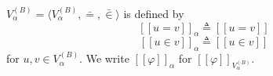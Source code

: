 $V_{\alpha}^{(B)} = \langle V_{\alpha}^{(B)}, \bar{=}, \bar{\in} \rangle$ is defined by
$$[\![u = v]\!]_{\alpha} \triangleq [\![u = v]\!]$$
$$[\![u \in v]\!]_{\alpha} \triangleq [\![u \in v]\!]$$
for $u, v \in V_{\alpha}^{(B)}$. We write $[\![\varphi]\!]_{\alpha}$ for $[\![\varphi]\!]_{V_{\alpha}^{(B)}}$.
